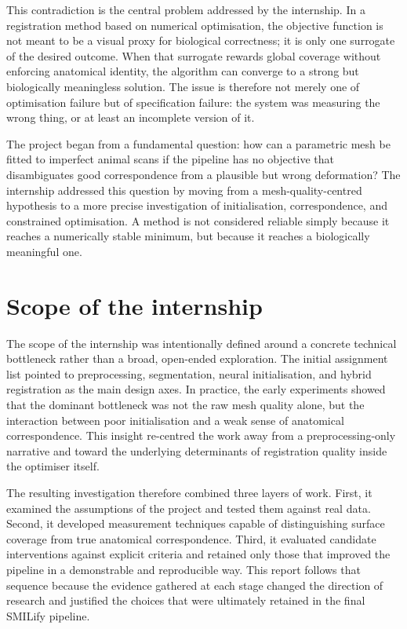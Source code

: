 This contradiction is the central problem addressed by the internship. In a
registration method based on numerical optimisation, the objective function is
not meant to be a visual proxy for biological correctness; it is only one
surrogate of the desired outcome. When that surrogate rewards global coverage
without enforcing anatomical identity, the algorithm can converge to a strong
but biologically meaningless solution. The issue is therefore not merely one of
optimisation failure but of specification failure: the system was measuring the
wrong thing, or at least an incomplete version of it.

The project began from a fundamental question: how can a parametric
mesh be fitted to imperfect animal scans if the pipeline has no objective that
disambiguates good correspondence from a plausible but wrong deformation? The
internship addressed this question by moving from a mesh-quality-centred
hypothesis to a more precise investigation of initialisation, correspondence,
and constrained optimisation. A method is not considered reliable simply
because it reaches a numerically stable minimum, but because it reaches a
biologically meaningful one.

\section{Scope of the internship}

The scope of the internship was intentionally defined around a concrete
technical bottleneck rather than a broad, open-ended exploration. The initial
assignment list pointed to preprocessing, segmentation, neural initialisation,
and hybrid registration as the main design axes. In practice, the early
experiments showed that the dominant bottleneck was not the raw mesh quality
alone, but the interaction between poor initialisation and a weak sense of
anatomical correspondence. This insight re-centred the work away from a
preprocessing-only narrative and toward the underlying determinants of
registration quality inside the optimiser itself.

The resulting investigation therefore combined three layers of work. First, it
examined the assumptions of the project and tested them against real data.
Second, it developed measurement techniques capable of distinguishing surface
coverage from true anatomical correspondence. Third, it evaluated candidate
interventions against explicit criteria and retained only those that improved
the pipeline in a demonstrable and reproducible way. This report follows that
sequence because the evidence gathered at each stage changed the direction of
research and justified the choices that were ultimately retained in the final
SMILify pipeline.

